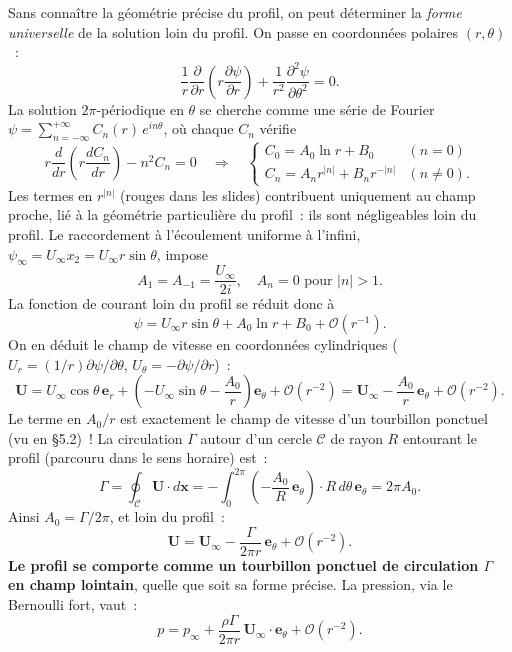 \documentclass[11pt,a4paper]{report}
\newcommand{\pd}[2]{\dfrac{\partial #1}{\partial #2}}
\begin{document}
Sans conna\^itre la g\'eom\'etrie pr\'ecise du profil, on peut d\'eterminer la \emph{forme
universelle} de la solution loin du profil. On passe en coordonn\'ees polaires $(r,\theta)$~:
\[
  \frac{1}{r}\pd{}{r}\!\left(r\pd{\psi}{r}\right)
  + \frac{1}{r^2}\frac{\partial^2\psi}{\partial\theta^2} = 0.
\]
La solution $2\pi$-p\'eriodique en $\theta$ se cherche comme une s\'erie de Fourier
$\psi = \sum_{n=-\infty}^{+\infty} C_n(r)\,e^{in\theta}$, o\`u chaque $C_n$ v\'erifie
\[
  r\frac{d}{dr}\!\left(r\frac{dC_n}{dr}\right) - n^2 C_n = 0
  \quad\Longrightarrow\quad
  \begin{cases} C_0 = A_0\ln r + B_0 & (n=0) \\
  C_n = A_n r^{|n|} + B_n r^{-|n|} & (n\ne 0). \end{cases}
\]
Les termes en $r^{|n|}$ (rouges dans les slides) contribuent uniquement au champ proche,
li\'e \`a la g\'eom\'etrie particuli\`ere du profil~: ils sont n\'egligeables loin du profil.
Le raccordement \`a l'\'ecoulement uniforme \`a l'infini,
$\psi_\infty = U_\infty x_2 = U_\infty r\sin\theta$, impose
\[
  A_1 = A_{-1} = \frac{U_\infty}{2i}, \quad A_n = 0 \text{ pour } |n|>1.
\]
La fonction de courant loin du profil se r\'eduit donc \`a
\[
  \psi = U_\infty r\sin\theta + A_0\ln r + B_0 + \mathcal{O}(r^{-1}).
\]
On en d\'eduit le champ de vitesse en coordonn\'ees cylindriques
($U_r = (1/r)\partial\psi/\partial\theta$, $U_\theta = -\partial\psi/\partial r$)~:
\[
  \boldsymbol{U} = U_\infty\cos\theta\,\boldsymbol{e}_r
  + \left(-U_\infty\sin\theta - \frac{A_0}{r}\right)\boldsymbol{e}_\theta
  + \mathcal{O}(r^{-2})
  = \boldsymbol{U}_\infty - \frac{A_0}{r}\,\boldsymbol{e}_\theta + \mathcal{O}(r^{-2}).
\]
Le terme en $A_0/r$ est exactement le champ de vitesse d'un tourbillon ponctuel (vu en
\S5.2)~! La circulation $\Gamma$ autour d'un cercle $\mathcal{C}$ de rayon $R$ entourant le
profil (parcouru dans le sens horaire) est~:
\[
  \Gamma = \oint_{\mathcal{C}} \boldsymbol{U}\cdot d\boldsymbol{x}
  = -\int_0^{2\pi} \left(-\frac{A_0}{R}\,\boldsymbol{e}_\theta\right)\cdot R\,d\theta\,
  \boldsymbol{e}_\theta = 2\pi A_0.
\]
Ainsi $A_0 = \Gamma/2\pi$, et loin du profil~:
\[
  \boldsymbol{U} = \boldsymbol{U}_\infty - \frac{\Gamma}{2\pi r}\,\boldsymbol{e}_\theta
  + \mathcal{O}(r^{-2}).
\]
\textbf{Le profil se comporte comme un tourbillon ponctuel de circulation $\Gamma$ en champ
lointain}, quelle que soit sa forme pr\'ecise. La pression, via le Bernoulli fort, vaut~:
\[
  p = p_\infty + \frac{\rho\Gamma}{2\pi r}\,\boldsymbol{U}_\infty\cdot\boldsymbol{e}_\theta
  + \mathcal{O}(r^{-2}).
\]
\end{document}
